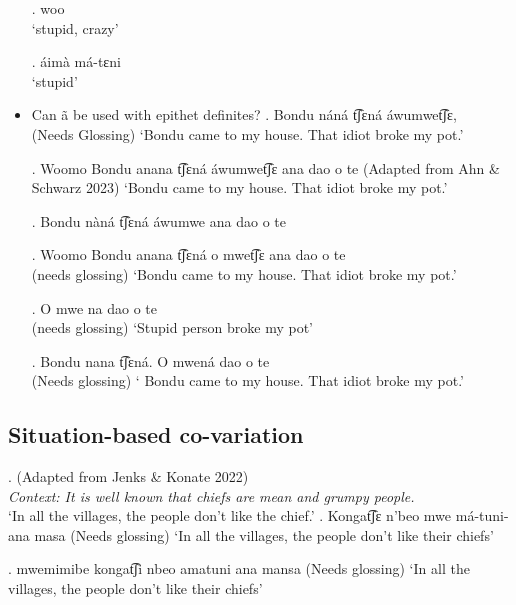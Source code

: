 \documentclass{assets/fieldnotes}
\begin{document}
\begin{itemize}


\exg. woo\\
`stupid, crazy'

\exg. áimà má-tɛni\\
`stupid'

    \item Can ã be used with epithet definites?
    \exg.   Bondu náná t͡ʃɛná áwumwet͡ʃɛ, \\
    (Needs Glossing)
`Bondu came to my house. That idiot broke my pot.'
    
    \exg. Woomo Bondu anana t͡ʃɛná áwumwet͡ʃɛ ana dao o te  (Adapted from Ahn \& Schwarz 2023)
    `Bondu came to my house. That idiot broke my pot.'

    \exg. Bondu nàná t͡ʃɛná áwumwe ana dao o te\\

\exg. Woomo Bondu anana t͡ʃɛná o mwet͡ʃɛ ana dao o te\\
(needs glossing)
 `Bondu came to my house. That idiot broke my pot.'


\exg. O mwe na dao o te\\
(needs glossing)
`Stupid person broke my pot'

\exg. Bondu nana t͡ʃɛná. O mwená dao o te\\
(Needs glossing)
` Bondu came to my house. That idiot broke my pot.'
     
\end{itemize}

\subsection{Situation-based co-variation}
   \ex. (Adapted from Jenks \& Konate 2022)\\
    \textit{Context: It is well known that chiefs are mean and grumpy people.}\\
    `In all the villages, the people don’t like the chief.'
\exg. Kongat͡ʃɛ n'beo mwe má-tuni-ana masa
(Needs glossing)
`In all the villages, the people don't like their chiefs'

\exg. mwemimibe kongat͡ʃi nbeo amatuni ana mansa 
(Needs glossing)
`In all the villages, the people don't like their chiefs'
\end{document}
